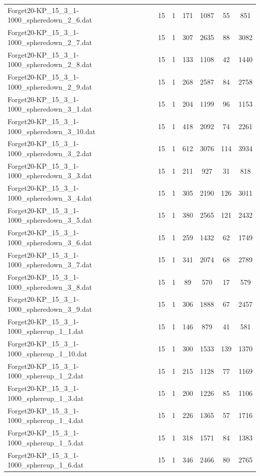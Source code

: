 \begin{table}[!ht]
\begin{tabular}{lcccccc}
Forget20-KP\_15\_3\_1-1000\_spheredown\_2\_6.dat & 15 & 1 & 171 & 1087 & 55 & 851 \\
Forget20-KP\_15\_3\_1-1000\_spheredown\_2\_7.dat & 15 & 1 & 307 & 2635 & 88 & 3082 \\
Forget20-KP\_15\_3\_1-1000\_spheredown\_2\_8.dat & 15 & 1 & 133 & 1108 & 42 & 1440 \\
Forget20-KP\_15\_3\_1-1000\_spheredown\_2\_9.dat & 15 & 1 & 268 & 2587 & 84 & 2758 \\
Forget20-KP\_15\_3\_1-1000\_spheredown\_3\_1.dat & 15 & 1 & 204 & 1199 & 96 & 1153 \\
Forget20-KP\_15\_3\_1-1000\_spheredown\_3\_10.dat & 15 & 1 & 418 & 2092 & 74 & 2261 \\
Forget20-KP\_15\_3\_1-1000\_spheredown\_3\_2.dat & 15 & 1 & 612 & 3076 & 114 & 3934 \\
Forget20-KP\_15\_3\_1-1000\_spheredown\_3\_3.dat & 15 & 1 & 211 & 927 & 31 & 818 \\
Forget20-KP\_15\_3\_1-1000\_spheredown\_3\_4.dat & 15 & 1 & 305 & 2190 & 126 & 3011 \\
Forget20-KP\_15\_3\_1-1000\_spheredown\_3\_5.dat & 15 & 1 & 380 & 2565 & 121 & 2432 \\
Forget20-KP\_15\_3\_1-1000\_spheredown\_3\_6.dat & 15 & 1 & 259 & 1432 & 62 & 1749 \\
Forget20-KP\_15\_3\_1-1000\_spheredown\_3\_7.dat & 15 & 1 & 341 & 2074 & 68 & 2789 \\
Forget20-KP\_15\_3\_1-1000\_spheredown\_3\_8.dat & 15 & 1 & 89 & 570 & 17 & 579 \\
Forget20-KP\_15\_3\_1-1000\_spheredown\_3\_9.dat & 15 & 1 & 306 & 1888 & 67 & 2457 \\
Forget20-KP\_15\_3\_1-1000\_sphereup\_1\_1.dat & 15 & 1 & 146 & 879 & 41 & 581 \\
Forget20-KP\_15\_3\_1-1000\_sphereup\_1\_10.dat & 15 & 1 & 300 & 1533 & 139 & 1370 \\
Forget20-KP\_15\_3\_1-1000\_sphereup\_1\_2.dat & 15 & 1 & 215 & 1128 & 77 & 1169 \\
Forget20-KP\_15\_3\_1-1000\_sphereup\_1\_3.dat & 15 & 1 & 200 & 1226 & 85 & 1106 \\
Forget20-KP\_15\_3\_1-1000\_sphereup\_1\_4.dat & 15 & 1 & 226 & 1365 & 57 & 1716 \\
Forget20-KP\_15\_3\_1-1000\_sphereup\_1\_5.dat & 15 & 1 & 318 & 1571 & 84 & 1383 \\
Forget20-KP\_15\_3\_1-1000\_sphereup\_1\_6.dat & 15 & 1 & 346 & 2466 & 80 & 2765 \\

\end{tabular}
\end{table}
